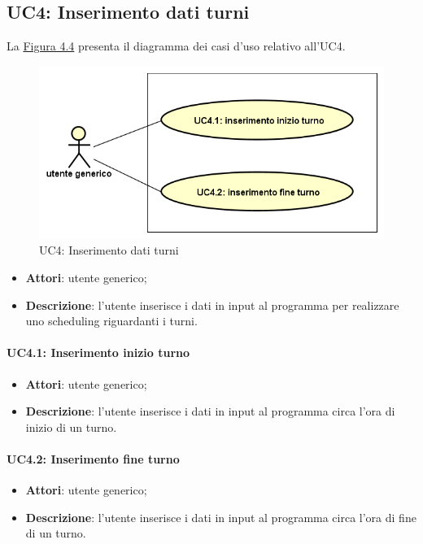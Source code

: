 \subsection{UC4: Inserimento dati turni}
\label{UC4}
La \hyperref[fig44]{Figura 4.4} presenta il diagramma dei casi d'uso relativo all'UC4.
\begin{figure}[!h]
    \label{fig44}
    \includegraphics[width=\textwidth]{../immagini/usecase/UC4.png}
    \caption{UC4: Inserimento dati turni}
\end{figure}
\FloatBarrier
\noindent
\begin{itemize}
    \item \textbf{Attori}: utente generico;
    \item \textbf{Descrizione}: l'utente inserisce i dati in input al programma per realizzare uno scheduling riguardanti i turni.
\end{itemize}
\paragraph{UC4.1: Inserimento inizio turno}
\begin{itemize}
\item \textbf{Attori}: utente generico;
\item \textbf{Descrizione}: l'utente inserisce i dati in input al programma circa l'ora di inizio di un turno.
\end{itemize}
\paragraph{UC4.2: Inserimento fine turno}
\begin{itemize}
\item \textbf{Attori}: utente generico;
\item \textbf{Descrizione}: l'utente inserisce i dati in input al programma circa l'ora di fine di un turno.
\end{itemize}

